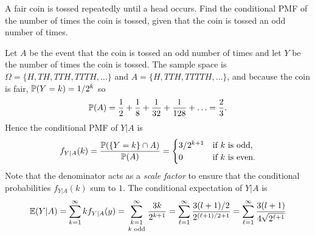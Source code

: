 \begin{example}\label{example:cond_pmf}
A fair coin is tossed repeatedly until a head occurs. Find the conditional PMF of the number of times the coin is tossed, given that the coin is tossed an odd number of times.
\begin{solution}
Let $A$ be the event that the coin is tossed an odd number of times and let $Y$ be the number of times the coin is tossed. 
The sample space is $\Omega=\{H,TH,TTH,TTTH,\ldots\}$ and $A=\{H,TTH, TTTTH,\ldots\}$, and because the coin is fair, $\mathbb{P}(Y=k)=1/2^k$ so
\[
\mathbb{P}(A) = \frac{1}{2} + \frac{1}{8} + \frac{1}{32} + \frac{1}{128} + \ldots = \frac{2}{3}.
\]
Hence the conditional PMF of $Y|A$ is 
\[
f_{Y|A}(k)
	= \frac{\mathbb{P}(\{Y=k\}\cap A)}{\mathbb{P}(A)}
	= \begin{cases}
	3/2^{k+1}	& \text{if $k$ is odd,} \\
	0			& \text{if $k$ is even.} 
	\end{cases}
\]
Note that the denominator acts as a \emph{scale factor} to ensure that the conditional probabilities $f_{Y|A}(k)$ sum to $1$.
The conditional expectation of $Y|A$ is
\[
\expe(Y|A) 
	= \sum_{k=1}^{\infty} k f_{Y|A}(y)
	= \sum_{\stackss{k=1}{k\text{ odd}}}^{\infty} \frac{3k}{2^{k+1}}
	= \sum_{\ell=1}^{\infty} \frac{3(l+1)/2}{2^{(\ell+1)/2+1}}
	= \sum_{\ell=1}^{\infty} \frac{3(l+1)}{4\sqrt{2^{\ell+1}}}
\]
\end{solution}
\end{example}

